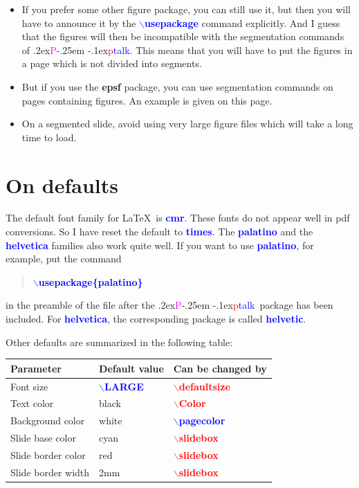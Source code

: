 \documentclass[12pt]{article}
\def\pptalk{{
\raise.2ex\hbox{\textcolor{magenta}P}\kern-.25em
\raise-.1ex\hbox{\textcolor{red}p}\textcolor{blue}{talk}}}
\def\ecomm#1{{\textcolor{blue}{$\backslash${\bf #1}}}}
\def\noncomm#1{{\textcolor{blue}{\bf #1}}}
\def\comm#1{{\textcolor{red}{$\backslash${\bf #1}}}}
\def\file#1{\textcolor{darkpurple}{\bf #1}}
\begin{document}
\endslide


\beginslide
\begin{itemize}
\item If you prefer some other figure package, you can still use it,
but then you will have to announce it by the \ecomm{usepackage}
command explicitly.  And I guess that the figures will then be
incompatible with the segmentation commands of \pptalk.  This means
that you will have to put the figures in a page which is not divided
into segments.

\item But if you use the \file{epsf} package, you can use segmentation
commands on pages containing figures.  An example is given on this
page.


\item On a segmented slide, avoid using very large figure files which
will take a long time to load.

\end{itemize}

\newsegment

\centerline{\epsfysize=8cm}

\endslide


\beginslide
\section{On defaults}
The default font family for \LaTeX\ is \noncomm{cmr}.  These fonts
do not appear well in pdf conversions.  So I have reset the default to
\noncomm{times}.  The \noncomm{palatino} and the \noncomm{helvetica}
families also work quite well.  If you want to use \noncomm{palatino},
for example, put the command
%
\begin{quote}
\ecomm{usepackage\{palatino\}}
\end{quote}
%
in the preamble of the file after the \pptalk\ package has been
included.  For \noncomm{helvetica}, the corresponding package is
called \noncomm{helvetic}.

Other defaults are summarized in the following table:
\begin{center}
\begin{tabular}{lll}
\hline
Parameter & Default value & Can be changed by \\ 
\hline
Font size & \ecomm{LARGE} & \comm{defaultsize} \\
Text color & black & \comm{Color} \\
Background color & white & \ecomm{pagecolor} \\ 
Slide base color & cyan & \comm{slidebox} \\
Slide border color & red & \comm{slidebox} \\
Slide border width & 2mm & \comm{slidebox} \\
\hline
\end{tabular}
\end{center}
\end{document}
